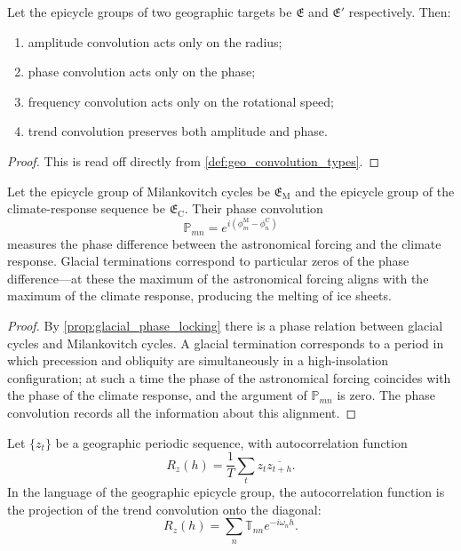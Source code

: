\begin{theorem}\label{thm:geo_convolution_action}
Let the epicycle groups of two geographic targets be $\mathfrak E$ and $\mathfrak E'$ respectively. Then:
\begin{enumerate}[label=(\roman*)]
    \item amplitude convolution acts only on the radius;
    \item phase convolution acts only on the phase;
    \item frequency convolution acts only on the rotational speed;
    \item trend convolution preserves both amplitude and phase.
\end{enumerate}
\end{theorem}

\begin{proof}
This is read off directly from \cref{def:geo_convolution_types}.
\end{proof}

\begin{proposition}\label{prop:geo_milankovitch_climate_convolution}
Let the epicycle group of Milankovitch cycles be $\mathfrak E_{\mathrm{M}}$ and the epicycle group of the climate-response sequence be $\mathfrak E_{\mathrm{C}}$. Their phase convolution
\[
\mathbb P_{mn}=e^{i(\phi_m^{\mathrm{M}}-\phi_n^{\mathrm{C}})}
\]
measures the phase difference between the astronomical forcing and the climate response. Glacial terminations correspond to particular zeros of the phase difference---at these the maximum of the astronomical forcing aligns with the maximum of the climate response, producing the melting of ice sheets.
\end{proposition}

\begin{proof}
By \cref{prop:glacial_phase_locking} there is a phase relation between glacial cycles and Milankovitch cycles. A glacial termination corresponds to a period in which precession and obliquity are simultaneously in a high-insolation configuration; at such a time the phase of the astronomical forcing coincides with the phase of the climate response, and the argument of $\mathbb P_{mn}$ is zero. The phase convolution records all the information about this alignment.
\end{proof}

\begin{proposition}\label{prop:geo_autocorr_phase_convolution}
Let $\{z_t\}$ be a geographic periodic sequence, with autocorrelation function
\[
R_z(h)=\frac1T\sum_t z_t\overline{z_{t+h}}.
\]
In the language of the geographic epicycle group, the autocorrelation function is the projection of the trend convolution onto the diagonal:
\[
R_z(h)=\sum_n\mathbb T_{nn}e^{-i\omega_n h}.
\]
\end{proposition}

